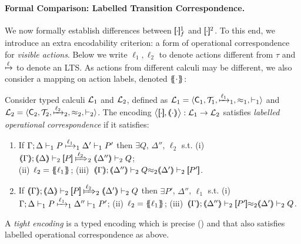 \documentclass[runningheads]{llncs}
\begin{document}
{{\paragraph{Formal Comparison: Labelled Transition Correspondence.}
We now formally establish differences between $\map{\cdot}_f^1$ and $\pmap{\cdot}{2}$.
To this end, 
we introduce an extra encodability criterion: a form of operational correspondence 
for \emph{visible actions}. 
Below we write $\ell_1, \ell_2$ to denote  
actions different from $\tau$
and  $\hby{\ell}$ to denote an LTS.
As actions from different calculi may be different, we also consider a mapping 
on action labels, denoted $\mapa{\cdot}$: 

\begin{definition}%
\label{def:lopco}
       Consider typed calculi $\tyl{L}_1$ and  $\tyl{L}_2$, defined as 
        $\tyl{L}_1=\calc{\CAL_1}{{\cal{T}}_1}{\hby{{\ell_1}}_1}{\wb_1}{\proves_1}$
       and $\tyl{L}_2=\calc{\CAL_2}{{\cal{T}}_2}{\hby{{\ell_2}}_2}{\wb_2}{\proves_2}$.
The encoding $\enco{\map{\cdot}, \mapt{\cdot}}: \tyl{L}_1 \to \tyl{L}_2$ satisfies
\emph{labelled operational correspondence}
if it satisfies:
	\begin{enumerate}[1.]
			\item
					If		$\stytraargi{\Gamma}{\ell_1}{\Delta}{P}{\Delta'}{P'}{1}{1}$
					then	$\exists Q$, $\Delta''$, $\ell_2$ s.t. 
							(i)~$\wtytraargi{\mapt{\Gamma}}{\ell_2}{\mapt{\Delta}}{\map{P}}{\mapt{\Delta''}}{Q}{2}{2}$;  \\
							(ii)~$\ell_2 = \mapa{\ell_1}$; 
							(iii)~${\mapt{\Gamma}};{\mapt{\Delta''}}\proves_2 {Q}{\wb_2}{\mapt{\Delta'}}\proves_2 {\map{P'}}$.
				
			\item
					If		$\wtytraargi{\mapt{\Gamma}}{\ell_2}{\mapt{\Delta}}{\map{P}}{\mapt{\Delta'}}{Q}{2}{2}$
					then	$\exists P'$, $\Delta''$, $\ell_1$ s.t. 
							(i)~$\stytraargi{\Gamma}{\ell_1}{\Delta}{P}{\Delta''}{P'}{1}{1}$;
							(ii)~$\ell_2 = \mapa{\ell_1}$;
							(iii)~${\mapt{\Gamma}};{\mapt{\Delta''}}\proves_2 {\map{P'}}{\wb_2}{\mapt{\Delta'}}\proves_2 {Q}$.
	\end{enumerate}
A \emph{tight encoding} is a typed 
encoding 
which is precise () and that also satisfies 
labelled operational correspondence as above.
\end{definition}

}}
\end{document}
